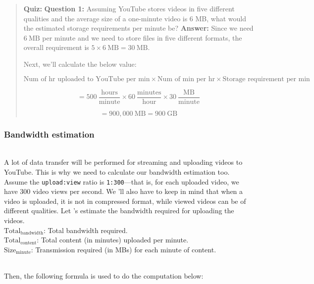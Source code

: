 \begin{quote}
\textbf{Quiz:}
\textbf{Question 1:} Assuming YouTube stores videos in five different qualities and the average size of a one-minute video is 6 MB, what would the estimated storage requirements per minute be?
\textbf{Answer:} Since we need $6\ \text{MB}$ per minute and we need to store files in five different formats,  
the overall requirement is  
$5 \times 6\ \text{MB} = 30\ \text{MB}.$

Next, we'll calculate the below value:

\[
\text{Num of hr uploaded to YouTube per min}
\times \text{Num of min per hr}
\times \text{Storage requirement per min}
\]

\[
= 500\ \frac{\text{hours}}{\text{minute}}
\times 60\ \frac{\text{minutes}}{\text{hour}}
\times 30\ \frac{\text{MB}}{\text{minute}}
\]

\[
= 900{,}000\ \text{MB} = 900\ \text{GB}
\]

\end{quote}

\subsubsection{Bandwidth estimation}\label{n4FQvEmUfqlchOTJhdPN8}
\\
A lot of data transfer will be performed for streaming and uploading videos to YouTube. This is why we need to calculate our bandwidth estimation too. Assume the \texttt{upload:view} ratio is \texttt{1:300}---that is, for each uploaded video, we have 300 video views per second. We 'll also have to keep in mind that when a video is uploaded, it is not in compressed format, while viewed videos can be of different qualities. Let
's estimate the bandwidth required for uploading the videos.
\\
\protect{}\label{katex_inline_5NrIld1msOnaPm-vyHmbK}{{{\(\text{Total}_\text{{bandwidth}}\)}}}: Total bandwidth required.
\\
\protect{}\label{katex_inline_jdg1bv8BS9aukneFpmiYR}{{{\(\text{Total}_\text{{content}}\)}}}: Total content (in minutes) uploaded per minute.
\\
\protect{}\label{katex_inline_d8XKUPM_h5Utqt_3ldZYE}{{{\(\text{Size}_\text{{minute}}\)}}}: Transmission required (in MBs) for each minute of content.\\
\strut \\
Then, the following formula is used to do the computation below:

